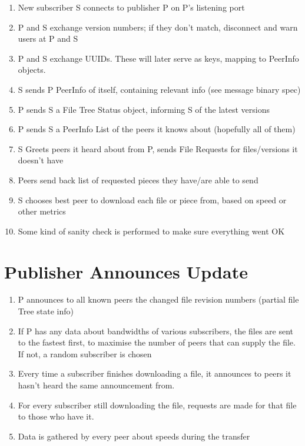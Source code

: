 \documentclass[12pt,a4paper,]{adreport}
\begin{document}
\begin{enumerate}
\def\labelenumi{\arabic{enumi}.}
\itemsep1pt\parskip0pt
\item
  New subscriber S connects to publisher P on P's listening port
\item
  P and S exchange version numbers; if they don't match, disconnect and
  warn users at P and S
\item
  P and S exchange UUIDs. These will later serve as keys, mapping to
  PeerInfo objects.
\item
  S sends P PeerInfo of itself, containing relevant info (see message
  binary spec)
\item
  P sends S a File Tree Status object, informing S of the latest
  versions
\item
  P sends S a PeerInfo List of the peers it knows about (hopefully all
  of them)
\item
  S Greets peers it heard about from P, sends File Requests for
  files/versions it doesn't have
\item
  Peers send back list of requested pieces they have/are able to send
\item
  S chooses best peer to download each file or piece from, based on
  speed or other metrics
\item
  Some kind of sanity check is performed to make sure everything went OK
\end{enumerate}

\section{Publisher Announces Update}\label{publisher-announces-update}

\begin{enumerate}
\def\labelenumi{\arabic{enumi}.}
\itemsep1pt\parskip0pt
\item
  P announces to all known peers the changed file revision numbers
  (partial file Tree state info)
\item
  If P has any data about bandwidths of various subscribers, the files
  are sent to the fastest first, to maximise the number of peers that
  can supply the file. If not, a random subscriber is chosen
\item
  Every time a subscriber finishes downloading a file, it announces to
  peers it hasn't heard the same announcement from.
\item
  For every subscriber still downloading the file, requests are made for
  that file to those who have it.
\item
  Data is gathered by every peer about speeds during the transfer
\end{enumerate}
\end{document}
